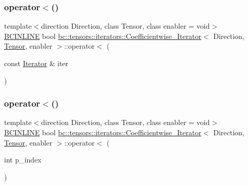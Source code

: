 \mbox{\label{structbc_1_1tensors_1_1iterators_1_1Coefficientwise__Iterator_a5ae9fb82012fb8cb602b6554b943ce6d}} 
\subsubsection{\texorpdfstring{operator$<$()}{operator<()}\hspace{0.1cm}{\footnotesize\ttfamily [1/2]}}
{\footnotesize\ttfamily template$<$direction Direction, class Tensor, class enabler = void$>$ \\
\hyperlink{common_8h_a6699e8b0449da5c0fafb878e59c1d4b1}{B\+C\+I\+N\+L\+I\+NE} bool \hyperlink{structbc_1_1tensors_1_1iterators_1_1Coefficientwise__Iterator}{bc\+::tensors\+::iterators\+::\+Coefficientwise\+\_\+\+Iterator}$<$ Direction, \hyperlink{namespacebc_a659391e47ab612be3ba6c18cf9c89159}{Tensor}, enabler $>$\+::operator$<$ (\begin{DoxyParamCaption}\item[{const \hyperlink{structbc_1_1tensors_1_1iterators_1_1Coefficientwise__Iterator_a313f76f47e60a806035279a36a84f835}{Iterator} \&}]{iter }\end{DoxyParamCaption})\hspace{0.3cm}{\ttfamily [inline]}}

\mbox{\label{structbc_1_1tensors_1_1iterators_1_1Coefficientwise__Iterator_a1096597a2e6d99b6cb7b3a85caf15e5b}} 
\subsubsection{\texorpdfstring{operator$<$()}{operator<()}\hspace{0.1cm}{\footnotesize\ttfamily [2/2]}}
{\footnotesize\ttfamily template$<$direction Direction, class Tensor, class enabler = void$>$ \\
\hyperlink{common_8h_a6699e8b0449da5c0fafb878e59c1d4b1}{B\+C\+I\+N\+L\+I\+NE} bool \hyperlink{structbc_1_1tensors_1_1iterators_1_1Coefficientwise__Iterator}{bc\+::tensors\+::iterators\+::\+Coefficientwise\+\_\+\+Iterator}$<$ Direction, \hyperlink{namespacebc_a659391e47ab612be3ba6c18cf9c89159}{Tensor}, enabler $>$\+::operator$<$ (\begin{DoxyParamCaption}\item[{int}]{p\+\_\+index }\end{DoxyParamCaption})\hspace{0.3cm}{\ttfamily [inline]}}

